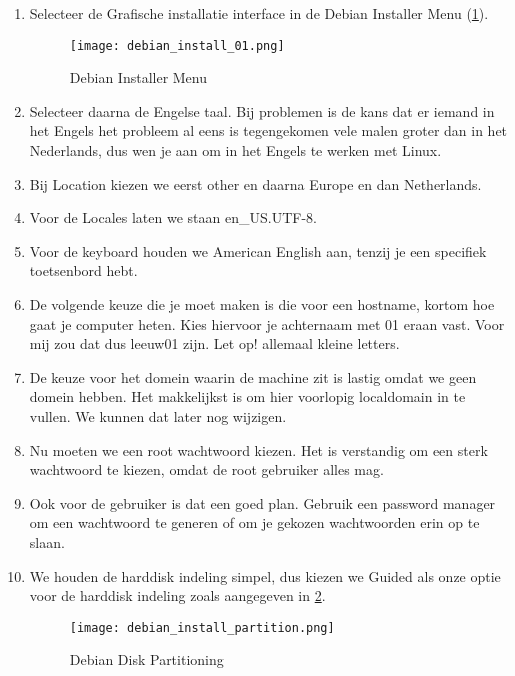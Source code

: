
\begin{enumerate}
\item Selecteer de Grafische installatie interface in de Debian Installer Menu (\ref{DebInstallMenu}).

\begin{figure}[H]
	\centering
	\texttt{[image: debian\_install\_01.png]}
	\caption{Debian Installer Menu}
	\label{DebInstallMenu}
\end{figure}

\item Selecteer daarna de Engelse taal. Bij problemen is de kans dat er iemand in het Engels het probleem al eens is tegengekomen vele malen groter dan in het Nederlands, dus wen je aan om in het Engels te werken met Linux.

\item Bij Location kiezen we eerst other en daarna Europe en dan Netherlands.

\item Voor de Locales laten we staan en\_US.UTF-8.

\item Voor de keyboard houden we American English aan, tenzij je een specifiek toetsenbord hebt.

\item De volgende keuze die je moet maken is die voor een hostname, kortom hoe gaat je computer heten. Kies hiervoor je achternaam met 01 eraan vast. Voor mij zou dat dus leeuw01 zijn. Let op! allemaal kleine letters.

\item De keuze voor het domein waarin de machine zit is lastig omdat we geen domein hebben. Het makkelijkst is om hier voorlopig localdomain in te vullen. We kunnen dat later nog wijzigen.

\item Nu moeten we een root wachtwoord kiezen. Het is verstandig om een sterk wachtwoord te kiezen, omdat de root gebruiker alles mag.

\item Ook voor de gebruiker is dat een goed plan. Gebruik een password manager om een wachtwoord te generen of om je gekozen wachtwoorden erin op te slaan.

\item We houden de harddisk indeling simpel, dus kiezen we Guided als onze optie voor de harddisk indeling zoals aangegeven in \ref{DebDiskPart}.

\begin{figure}[H]
	\centering
	\texttt{[image: debian\_install\_partition.png]}
	\caption{Debian Disk Partitioning}
	\label{DebDiskPart}
\end{figure}


\end{enumerate}
